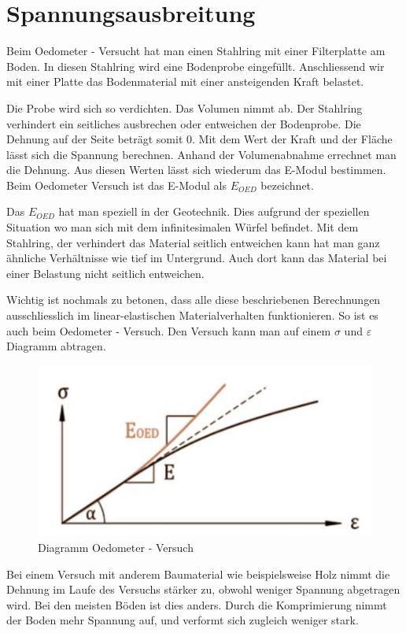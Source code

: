 \section{Spannungsausbreitung\label{spannung:section:Oedometer - Versuch}}
Beim Oedometer - Versucht hat man einen Stahlring mit einer Filterplatte am Boden.
In diesen Stahlring wird eine Bodenprobe eingefüllt.
Anschliessend wir mit einer Platte das Bodenmaterial mit einer ansteigenden Kraft belastet.

Die Probe wird sich so verdichten. Das Volumen nimmt ab.
Der Stahlring verhindert ein seitliches ausbrechen oder entweichen der Bodenprobe.
Die Dehnung auf der Seite beträgt somit 0.
Mit dem Wert der Kraft und der Fläche lässt sich die Spannung berechnen.
Anhand der Volumenabnahme errechnet man die Dehnung.
Aus diesen Werten lässt sich wiederum das E-Modul bestimmen.
Beim Oedometer Versuch ist das E-Modul als $E_{OED}$ bezeichnet.

Das $E_{OED}$ hat man speziell in der Geotechnik.
Dies aufgrund der speziellen Situation wo man sich mit dem infinitesimalen Würfel befindet.
Mit dem Stahlring, der verhindert das Material seitlich entweichen kann hat man ganz ähnliche Verhältnisse wie tief im Untergrund.
Auch dort kann das Material bei einer Belastung nicht seitlich entweichen.

Wichtig ist nochmals zu betonen, dass alle diese beschriebenen Berechnungen ausschliesslich im linear-elastischen Materialverhalten funktionieren.
So ist es auch beim Oedometer - Versuch.
Den Versuch kann man auf einem $\sigma$ und $\varepsilon$ Diagramm abtragen.

\begin{figure}
	\centering
	\includegraphics[width=0.5\linewidth,keepaspectratio]{papers/spannung/Grafiken/DiagrammOedometer-Versuch.jpg}
	\caption{Diagramm Oedometer - Versuch}
	\label{fig:Diagramm Oedometer - Versuch}
\end{figure}

Bei einem Versuch mit anderem Baumaterial wie beispielsweise Holz nimmt die Dehnung im Laufe des Versuchs stärker zu, obwohl weniger Spannung abgetragen wird.
Bei den meisten Böden ist dies anders. Durch die Komprimierung nimmt der Boden mehr Spannung auf, und verformt sich zugleich weniger stark.

